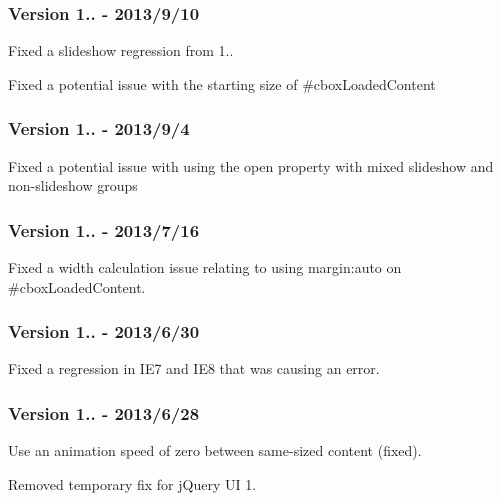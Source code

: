\subsubsection*{Version 1.. -\/ 2013/9/10}


\begin{DoxyItemize}
\item Fixed a slideshow regression from 1..
\item Fixed a potential issue with the starting size of \#cbox\-Loaded\-Content
\end{DoxyItemize}

\subsubsection*{Version 1.. -\/ 2013/9/4}


\begin{DoxyItemize}
\item Fixed a potential issue with using the open property with mixed slideshow and non-\/slideshow groups
\end{DoxyItemize}

\subsubsection*{Version 1.. -\/ 2013/7/16}


\begin{DoxyItemize}
\item Fixed a width calculation issue relating to using margin\-:auto on \#cbox\-Loaded\-Content.
\end{DoxyItemize}

\subsubsection*{Version 1.. -\/ 2013/6/30}


\begin{DoxyItemize}
\item Fixed a regression in I\-E7 and I\-E8 that was causing an error.
\end{DoxyItemize}

\subsubsection*{Version 1.. -\/ 2013/6/28}


\begin{DoxyItemize}
\item Use an animation speed of zero between same-\/sized content (fixed).
\item Removed temporary fix for j\-Query U\-I 1.
\end{DoxyItemize}

